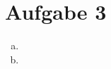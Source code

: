 \documentclass{scrartcl}
\begin{document}
\section*{Aufgabe 3}

\begin{enumerate}[a)]
\item
\item
\end{enumerate}
\end{document}
